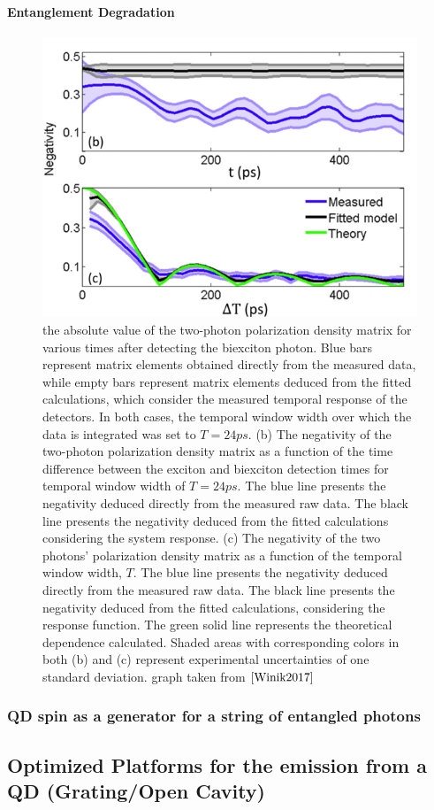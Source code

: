  \paragraph{Entanglement Degradation}
 \begin{figure}[H]
	\centering
	\includegraphics[scale=0.9]{figures/Entanglement_Integration.png}
	\caption{the absolute value of the two-photon polarization density matrix for various times after detecting the biexciton photon. Blue bars represent matrix elements obtained directly from the measured data, while empty bars represent matrix elements deduced from the fitted calculations, which consider the measured
temporal response of the detectors. In both cases, the temporal window width over which the data is integrated was set to $T = 24 ps$. (b) The negativity of the two-photon polarization density matrix as a function of the time difference between the exciton and biexciton detection times for temporal window width of $T = 24 ps$. The blue line presents the negativity deduced directly from the measured raw data. The black line presents the negativity deduced from the fitted
calculations considering the system response. (c) The negativity of the two photons' polarization density matrix as a function of the temporal window width, $T$. The blue line presents the negativity deduced directly from the measured raw data. The black line presents the negativity deduced from the fitted calculations, considering the response function. The green solid line represents the theoretical dependence calculated. Shaded areas with corresponding colors in both (b) and (c) represent experimental uncertainties of one standard deviation. graph taken from $\cite{Winik2017}$}
	\label{fig:entanglement_degration}
\end{figure}
\subsubsection{QD spin as a generator for a string of entangled photons}

\subsection{Optimized Platforms for the emission from a QD (Grating/Open Cavity)}


